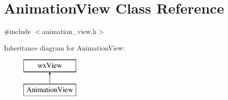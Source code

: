 \hypertarget{a00015}{\section{Animation\-View Class Reference}
\label{a00015}
}


{\ttfamily \#include $<$animation\-\_\-view.\-h$>$}

Inheritance diagram for Animation\-View\-:\begin{figure}[H]
\begin{center}
\leavevmode
\includegraphics[height=2.000000cm]{a00015}
\end{center}
\end{figure}
